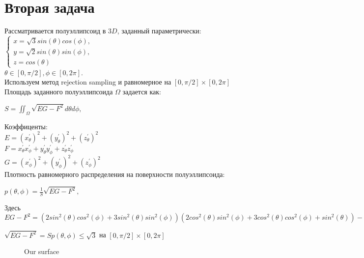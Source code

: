 \documentclass{article}
\begin{document}
\section{Вторая задача}
Рассматривается полуэллипсоид в $3D$, заданный параметрически:\\
$
\begin{cases}
x = \sqrt{3}sin(\theta)cos(\phi), \\
y = \sqrt{2}sin(\theta)sin(\phi), \\
z = cos(\theta)
\end{cases}
$\\
$\theta \in [0,\pi/2], \phi \in [0,2\pi].$\\
Используем метод rejection sampling и равномерное на $[0, \pi/2]\times[0,2\pi]$
Площадь заданного полуэллипсоида $\Omega$ задается как:
\begin{center}
$S = \iint_{\Omega} \sqrt{EG - F^2}d\theta d\phi,$
\end{center}
Коэффиценты:\\
$E = (x_{\theta}^{'})^2 + (y_{\theta}^{'})^2 + (z_{\theta}^{'})^2$\\
$F = x_{\theta}^{'}x_{\phi}^{'} + y_{\theta}^{'}y_{\phi}^{'} + z_{\theta}^{'}z_{\phi}^{'}$\\
$G = (x_{\phi}^{'})^2 + (y_{\phi}^{'})^2 + (z_{\phi}^{'})^2$\\
Плотность равномерного распределения на поверхности полуэллипсоида:
\begin{center}
$p(\theta, \phi) = \frac{1}{S} \sqrt{EG - F^2},$
\end{center}
Здесь $EG - F^2 = (2sin^2(\theta)cos^2(\phi) + 3sin^2(\theta)sin^2(\phi))(2cos^2(\theta)sin^2(\phi) + 3cos^2(\theta)cos^2(\phi) + sin^2(\theta)) - sin^2(\theta)sin^2(\phi)cos^2(\theta)cos^2(\phi)$
\begin{center}
$\sqrt{EG - F^2} = Sp(\theta,\phi) \leq \sqrt{3}$ на $[0,\pi/2]\times [0,2\pi]$
\end{center}

\begin{figure}[h]
\caption{Our surface}
\label{ris:image}
\end{figure}
\end{document}
